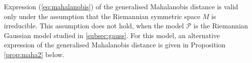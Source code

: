 \documentclass{svmult}
\begin{document}
Expression (\ref{eq:mahalanobis}) of the generalised Mahalanobis distance is valid only under the assumption that the Riemannian symmetric space $M$ is irreducible. This assumption does not hold, when the model $\mathcal{P}$ is the Riemannian Gaussian model studied in \ref{subsec:gauss}. For this model, an alternative expression of the generalised Mahalanobis distance is given in Proposition \ref{prop:maha2} below.
   
\end{document}
